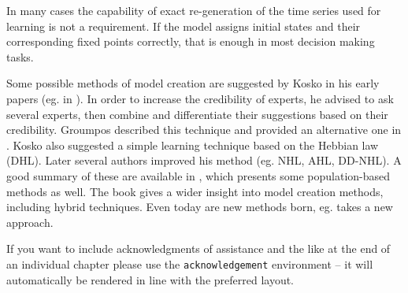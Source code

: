 \documentclass[graybox]{svmult}
\begin{document}
In many cases the capability of exact re-generation of the time series used for learning is not a requirement. If the model assigns initial states and their corresponding fixed points correctly, that is enough in most decision making tasks.

Some possible methods of model creation are suggested by Kosko in his early papers (eg. in \cite{kosko1988hidden,dickerson1994virtual}). In order to increase the credibility of experts, he advised to ask several experts, then combine and differentiate their suggestions based on their credibility. Groumpos described this technique and provided an alternative one in \cite{groumpos2010fuzzy}. Kosko also suggested a simple learning technique based on the Hebbian law (DHL). Later several authors improved his method (eg. NHL, AHL, DD-NHL). A good summary of these are available in \cite{papageorgiou2012learning}, which presents some population-based methods as well. The book \cite{papageorgiou2013fuzzy} gives a wider insight into model creation methods, including hybrid techniques. Even today are new methods born, eg. \cite{lu2019fast} takes a new approach.

\begin{acknowledgement}
If you want to include acknowledgments of assistance and the like at the end of an individual chapter please use the \verb|acknowledgement| environment -- it will automatically be rendered in line with the preferred layout.
\end{acknowledgement}


\end{document}
